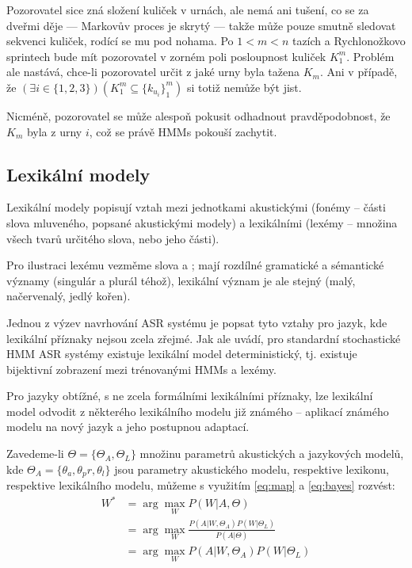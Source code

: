 Pozorovatel sice zná složení kuliček v urnách, ale nemá ani tušení, co se za dveřmi děje --- Markovův proces je skrytý --- takže může pouze smutně sledovat sekvenci kuliček, rodící se mu pod nohama. Po $1<m<n$ tazích a Rychlonožkovo sprintech bude mít pozorovatel v zorném poli posloupnost kuliček $K_1^m$. Problém ale nastává, chce-li pozorovatel určit z jaké urny byla tažena $K_m$. Ani v případě, že $(\exists i \in \{1, 2, 3\})(K_1^m \subseteq \{k_{u_i}\}_1^m)$ si totiž nemůže být jist.

Nicméně, pozorovatel se může alespoň pokusit odhadnout pravděpodobnost, že $K_m$ byla z urny $i$, což se právě HMMs pokouší zachytit.

\subsection{Lexikální modely}

Lexikální modely popisují vztah mezi jednotkami akustickými (fonémy -- části slova mluveného, popsané akustickými modely) a lexikálními (lexémy -- množina všech tvarů určitého slova, nebo jeho části). 

Pro ilustraci lexému vezměme slova  a ; mají rozdílné gramatické a sémantické významy (singulár a plurál téhož), lexikální význam je ale stejný (malý, načervenalý, jedlý kořen). 

Jednou z výzev navrhování ASR systému je popsat tyto vztahy pro jazyk, kde lexikální příznaky nejsou zcela zřejmé. Jak ale \cite{rasipuram_2014} uvádí, pro standardní stochastické HMM ASR systémy existuje lexikální model deterministický, tj. existuje bijektivní zobrazení mezi trénovanými HMMs a lexémy.

Pro jazyky obtížné, s ne zcela formálními lexikálními příznaky, lze lexikální model odvodit z některého lexikálního modelu již známého -- aplikací známého modelu na nový jazyk a jeho postupnou adaptací.

Zavedeme-li $\Theta = \{\Theta_A, \Theta_L\}$ množinu parametrů akustických a jazykových modelů, kde $\Theta_A = \{\theta_a, \theta_pr, \theta_l\}$ jsou parametry akustického modelu, respektive lexikonu, respektive lexikálního modelu, můžeme s využitím \ref{eq:map} a \ref{eq:bayes} rozvést:
%
\begin{align}
	\label{eq:lm}
	W^* &= \arg \max_W P(W|A, \Theta)\\
	    &= \arg \max_W \frac{P(A|W, \Theta_A)P(W|\Theta_L)}{P(A|\Theta)}\\
	    &= \arg \max_W P(A|W, \Theta_A)P(W|\Theta_L)
\end{align}


